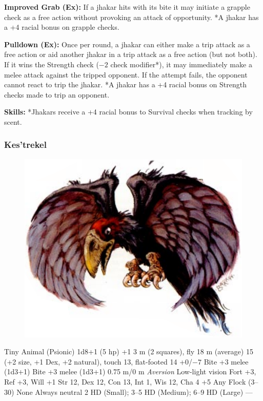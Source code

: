 \textbf{Improved Grab (Ex):} If a jhakar hits with its bite it may initiate a grapple check as a free action without provoking an attack of opportunity. *A jhakar has a +4 racial bonus on grapple checks.

\textbf{Pulldown (Ex):} Once per round, a jhakar can either make a trip attack as a free action or aid another jhakar in a trip attack as a free action (but not both). If it wins the Strength check ($-2$ check modifier*), it may immediately make a melee attack against the tripped opponent. If the attempt fails, the opponent cannot react to trip the jhakar. *A jhakar has a +4 racial bonus on Strength checks made to trip an opponent.

\textbf{Skills:} *Jhakars receive a +4 racial bonus to Survival checks when tracking by scent.

\subsubsection{Kes'trekel}
\begin{figure}[b!]
\centering
\includegraphics[width=\columnwidth]{images/kes-trekel.png}
\WOTC
\end{figure}

\begin{MonsterStats}
{Tiny Animal (Psionic)}
{1d8+1 (5 hp)}
{+1}
{3 m (2 squares), fly 18 m (average)}
{15 (+2 size, +1 Dex, +2 natural), touch 13, flat-footed 14}
{+0/$-7$}
{Bite +3 melee (1d3+1)}
{Bite +3 melee (1d3+1)}
{0.75 m/0 m}
{\emph{Aversion}}
{Low-light vision}
{Fort +3, Ref +3, Will +1}
{Str 12, Dex 12, Con 13, Int 1, Wis 12, Cha 4}
{ +5}
{}
{Any}
{Flock (3--30)}
{\onehalf}
{None}
{Always neutral}
{2 HD (Small); 3--5 HD (Medium); 6--9 HD (Large)}
{---}
\end{MonsterStats}

